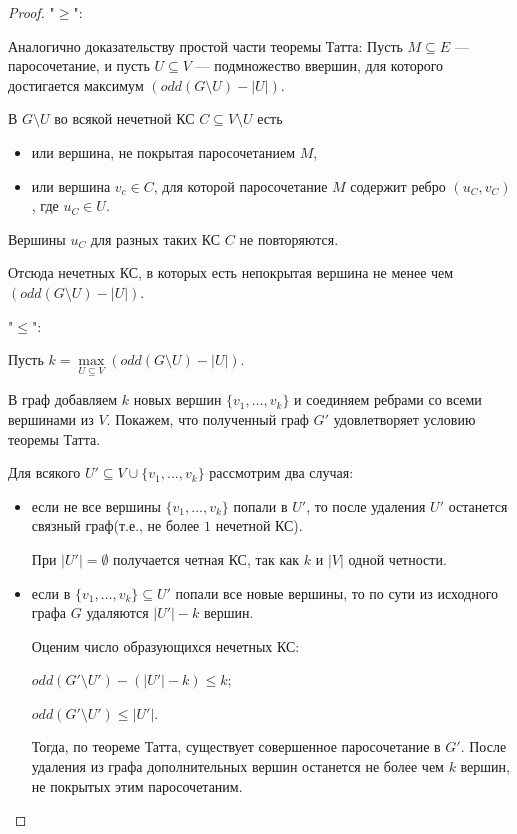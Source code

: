 \begin{proof}

    "$\geq$":

    Аналогично доказательству простой части теоремы Татта:
    Пусть $M \subseteq E$ --- паросочетание, и пусть $U \subseteq V$ --- подмножество ввершин, для которого достигается максимум $(odd(G \setminus U) - |U|)$.

    В $G \setminus U$ во всякой нечетной КС $C \subseteq V \setminus U$ есть
    \begin{itemize}
        \item или вершина, не покрытая паросочетанием $M$,
    
        \item или вершина $v_c \in C$, для которой паросочетание $M$ содержит ребро $(u_C, v_C)$, где $u_C \in U$.
    \end{itemize}

    Вершины $u_C$ для разных таких КС $C$ не повторяются.

    Отсюда нечетных КС, в которых есть непокрытая вершина не менее чем $(odd(G \setminus U) - |U|)$.

    "$\leq$":

    Пусть $k = \max\limits_{U \subseteq V} (odd(G \setminus U) - |U|)$.

    В граф добавляем $k$ новых вершин $\{v_1, \ldots, v_k\}$ и соединяем ребрами со всеми вершинами из $V$. Покажем, что полученный граф $G'$ удовлетворяет условию теоремы Татта.

    Для всякого $U' \subseteq V \cup \{v_1, \ldots, v_k\}$ рассмотрим два случая:

    \begin{itemize}
        \item если не все вершины $\{v_1, \ldots, v_k\}$ попали в $U'$, то после удаления $U'$ останется связный граф(т.е., не более $1$ нечетной КС).
        
        При $|U'| = \emptyset$ получается четная КС, так как $k$ и $|V|$ одной четности.
        
        \item если в $\{v_1, \ldots, v_k\} \subseteq U'$ попали все новые вершины, то по сути из исходного графа $G$ удаляются $|U'| - k$ вершин.
        
        Оценим число образующихся нечетных КС:
        
        $odd(G' \setminus U') - (|U'| - k) \leq k$;
        
        $odd(G' \setminus U') \leq |U'|$.
        
        Тогда, по теореме Татта, существует совершенное паросочетание в $G'$. После удаления из графа дополнительных вершин останется не более чем $k$ вершин, не покрытых этим паросочетаним.
    \end{itemize}
\end{proof}